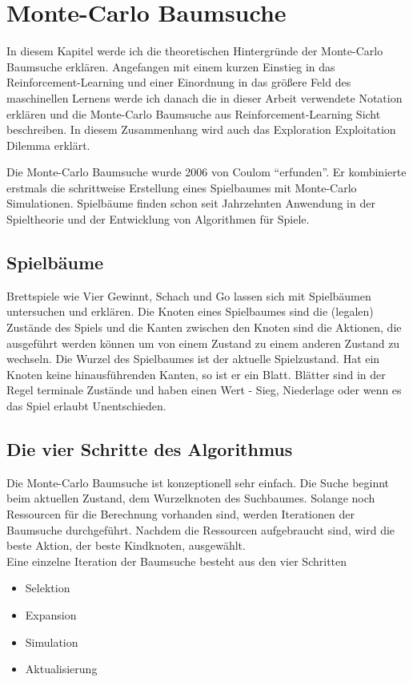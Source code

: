 \section{Monte-Carlo Baumsuche}

In diesem Kapitel werde ich die theoretischen Hintergründe der Monte-Carlo Baumsuche erklären. Angefangen mit einem kurzen Einstieg in das Reinforcement-Learning und einer Einordnung in das größere Feld des maschinellen Lernens werde ich danach die in dieser Arbeit verwendete Notation erklären und die Monte-Carlo Baumsuche aus Reinforcement-Learning Sicht beschreiben. In diesem Zusammenhang wird auch das Exploration Exploitation Dilemma erklärt.\\
\par
Die Monte-Carlo Baumsuche wurde 2006 von Coulom “erfunden”. Er kombinierte erstmals die schrittweise Erstellung eines Spielbaumes mit Monte-Carlo Simulationen. Spielbäume finden schon seit Jahrzehnten Anwendung in der Spieltheorie und der Entwicklung von Algorithmen für Spiele. 

\subsection{Spielbäume}
Brettspiele wie Vier Gewinnt, Schach und Go lassen sich mit Spielbäumen untersuchen und erklären. Die Knoten eines Spielbaumes sind die (legalen) Zustände des Spiels und die Kanten zwischen den Knoten sind die Aktionen, die ausgeführt werden können um von einem Zustand zu einem anderen Zustand zu wechseln. Die Wurzel des Spielbaumes ist der aktuelle Spielzustand. Hat ein Knoten keine hinausführenden Kanten, so ist er ein Blatt. Blätter sind in der Regel terminale Zustände und haben einen Wert - Sieg, Niederlage oder wenn es das Spiel erlaubt Unentschieden.

\subsection{Die vier Schritte des Algorithmus}
Die Monte-Carlo Baumsuche ist konzeptionell sehr einfach. Die Suche beginnt beim aktuellen Zustand, dem Wurzelknoten des Suchbaumes. Solange noch Ressourcen für die Berechnung vorhanden sind, werden Iterationen der Baumsuche durchgeführt. Nachdem die Ressourcen aufgebraucht sind, wird die beste Aktion, der beste Kindknoten, ausgewählt.\\
Eine einzelne Iteration der Baumsuche besteht aus den vier Schritten
\begin{itemize}
	\item Selektion
	\item Expansion
	\item Simulation
	\item Aktualisierung
\end{itemize}


